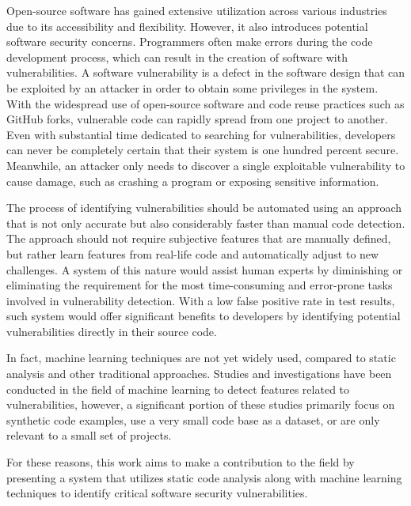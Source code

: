 Open-source software has gained extensive utilization across various industries due to its accessibility and flexibility. However, it also introduces potential software security concerns. Programmers often make errors during the code development process, which can result in the creation of software with vulnerabilities. A software vulnerability is a defect in the software design that can be exploited by an attacker in order to obtain some privileges in the system. With the widespread use of open-source software and code reuse practices such as GitHub forks, vulnerable code can rapidly spread from one project to another. Even with substantial time dedicated to searching for vulnerabilities, developers can never be completely certain that their system is one hundred percent secure. Meanwhile, an attacker only needs to discover a single exploitable vulnerability to cause damage, such as crashing a program or exposing sensitive information.

The process of identifying vulnerabilities should be automated using an approach that is not only accurate but also considerably faster than manual code detection. The approach should not require subjective features that are manually defined, but rather learn features from real-life code and automatically adjust to new challenges. A system of this nature would assist human experts by diminishing or eliminating the requirement for the most time-consuming and error-prone tasks involved in vulnerability detection. With a low false positive rate in test results, such system  would offer significant benefits to developers by identifying potential vulnerabilities directly in their source code.

In fact, machine learning techniques are not yet widely used, compared to static analysis and other traditional approaches. Studies and investigations have been conducted in the field of machine learning to detect features related to vulnerabilities, however, a significant portion of these studies primarily focus on synthetic code examples, use a very small code base as a dataset, or are only relevant to a small set of projects.

For these reasons, this work aims to make a contribution to the field by presenting a system that utilizes static code analysis along with machine learning techniques to identify critical software security vulnerabilities.




